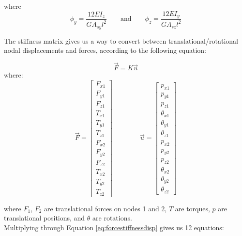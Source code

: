 { where
\[ \phi_y = \dfrac{12EI_z}{GA_{sy}l^2} \qquad  \textrm{and} \qquad \phi_z = \dfrac{12EI_y}{GA_{sz}l^2} \]


The stiffness matrix gives us a way to convert between translational/rotational nodal displacements and forces, according to the following equation:

 \begin{equation} \label{eq:forcestiffnessdisp} \vec{F} = K\vec{u} \end{equation}
where:
\[ \vec{F} =  \left[ \begin{array}{ccc}
F_{x1}\\
F_{y1}\\
F_{z1}\\
T_{x1}\\
T_{y1}\\
T_{z1}\\
F_{x2}\\
F_{y2}\\
F_{z2}\\
T_{x2}\\
T_{y2}\\
T_{z2}
 \end{array} \right]  \qquad \qquad  
 \vec{u} =  \left[ \begin{array}{ccc}
p_{x1}\\
p_{y1}\\
p_{z1}\\
\theta_{x1}\\
\theta_{y1}\\
\theta_{z1}\\
p_{x2}\\
p_{y2}\\
p_{z2}\\
\theta_{x2}\\
\theta_{y2}\\
\theta_{z2}
 \end{array} \right]
 \]
 
where $F_1$, $F_2$ are translational forces on nodes 1 and 2, $T$ are torques, $p$ are translational positions, and $\theta$ are rotations.\\

Multiplying through Equation \ref{eq:forcestiffnessdisp} gives us 12 equations:

}
